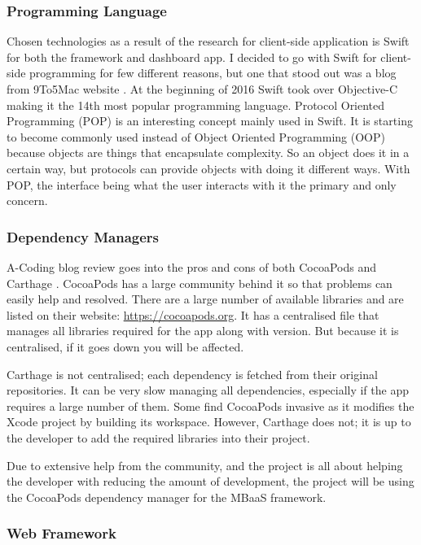 \subsubsection{Programming Language}

Chosen technologies as a result of the research for client-side application is Swift for both the framework and dashboard app. I decided to go with Swift for client-side programming for few different reasons, but one that stood out was a blog from 9To5Mac website \cite{webserver}. At the beginning of 2016 Swift took over Objective-C making it the 14th most popular programming language. Protocol Oriented Programming (POP) is an interesting concept mainly used in Swift. It is starting to become commonly used instead of Object Oriented Programming (OOP) because objects are things that encapsulate complexity. So an object does it in a certain way, but protocols can provide objects with doing it different ways. With POP, the interface being what the user interacts with it the primary and only concern.

\subsubsection{Dependency Managers}

A-Coding blog review goes into the pros and cons of both CocoaPods and Carthage \cite{acodingwebsite}.  CocoaPods has a large community behind it so that problems can easily help and resolved. There are a large number of available libraries and are listed on their website: \url{https://cocoapods.org}. It has a centralised file that manages all libraries required for the app along with version. But because it is centralised, if it goes down you will be affected.

Carthage is not centralised; each dependency is fetched from their original repositories. It can be very slow managing all dependencies, especially if the app requires a large number of them. Some find CocoaPods invasive as it modifies the Xcode project by building its workspace. However, Carthage does not; it is up to the developer to add the required libraries into their project.

Due to extensive help from the community, and the project is all about helping the developer with reducing the amount of development, the project will be using the CocoaPods dependency manager for the MBaaS framework.

\subsubsection{Web Framework}

